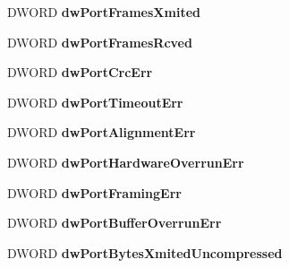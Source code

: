 \begin{DoxyCompactItemize}
\item 
\mbox{\label{struct___r_a_s___p_o_r_t___s_t_a_t_i_s_t_i_c_s_a4787cd6a5be3eaf401fbf6d9d099ccc3}} 
D\+W\+O\+RD {\bfseries dw\+Port\+Frames\+Xmited}
\item 
\mbox{\label{struct___r_a_s___p_o_r_t___s_t_a_t_i_s_t_i_c_s_a95173bcfd7f51a18aba5ca79b913bc5e}} 
D\+W\+O\+RD {\bfseries dw\+Port\+Frames\+Rcved}
\item 
\mbox{\label{struct___r_a_s___p_o_r_t___s_t_a_t_i_s_t_i_c_s_a179736e928922e607f248d31e05b754a}} 
D\+W\+O\+RD {\bfseries dw\+Port\+Crc\+Err}
\item 
\mbox{\label{struct___r_a_s___p_o_r_t___s_t_a_t_i_s_t_i_c_s_a57b573da78f626b235b114ddee2ede95}} 
D\+W\+O\+RD {\bfseries dw\+Port\+Timeout\+Err}
\item 
\mbox{\label{struct___r_a_s___p_o_r_t___s_t_a_t_i_s_t_i_c_s_aea6b0d00594f267f5fdd547ee4e5162c}} 
D\+W\+O\+RD {\bfseries dw\+Port\+Alignment\+Err}
\item 
\mbox{\label{struct___r_a_s___p_o_r_t___s_t_a_t_i_s_t_i_c_s_a22cee9790dd722834650d30350ca854a}} 
D\+W\+O\+RD {\bfseries dw\+Port\+Hardware\+Overrun\+Err}
\item 
\mbox{\label{struct___r_a_s___p_o_r_t___s_t_a_t_i_s_t_i_c_s_a5f8b3b8e76c6bee19ea1589e9c0bc503}} 
D\+W\+O\+RD {\bfseries dw\+Port\+Framing\+Err}
\item 
\mbox{\label{struct___r_a_s___p_o_r_t___s_t_a_t_i_s_t_i_c_s_a9b680383731aa4b0645e00962b4403a2}} 
D\+W\+O\+RD {\bfseries dw\+Port\+Buffer\+Overrun\+Err}
\item 
\mbox{\label{struct___r_a_s___p_o_r_t___s_t_a_t_i_s_t_i_c_s_a342b8f8a7c4f46464c09683820102843}} 
D\+W\+O\+RD {\bfseries dw\+Port\+Bytes\+Xmited\+Uncompressed}
\item 

\end{DoxyCompactItemize}
